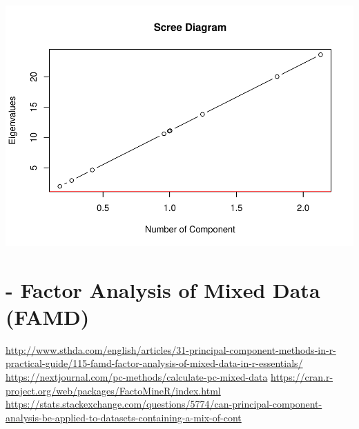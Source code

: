 \documentclass[
]{article}
\newenvironment{Shaded}{\begin{snugshade}}{\end{snugshade}}
\newcommand{\CommentTok}[1]{\textcolor[rgb]{0.56,0.35,0.01}{\textit{#1}}}
\newcommand{\DataTypeTok}[1]{\textcolor[rgb]{0.13,0.29,0.53}{#1}}
\newcommand{\DecValTok}[1]{\textcolor[rgb]{0.00,0.00,0.81}{#1}}
\newcommand{\KeywordTok}[1]{\textcolor[rgb]{0.13,0.29,0.53}{\textbf{#1}}}
\newcommand{\NormalTok}[1]{#1}
\newcommand{\OperatorTok}[1]{\textcolor[rgb]{0.81,0.36,0.00}{\textbf{#1}}}
\newcommand{\StringTok}[1]{\textcolor[rgb]{0.31,0.60,0.02}{#1}}
\begin{document}
\begin{Shaded}
\end{Shaded}

\includegraphics{project-code_files/figure-latex/unnamed-chunk-31-1.pdf}

\hypertarget{factor-analysis-of-mixed-data-famd}{%
\section{- Factor Analysis of Mixed Data
(FAMD)}\label{factor-analysis-of-mixed-data-famd}}

\url{http://www.sthda.com/english/articles/31-principal-component-methods-in-r-practical-guide/115-famd-factor-analysis-of-mixed-data-in-r-essentials/}
\url{https://nextjournal.com/pc-methods/calculate-pc-mixed-data}
\url{https://cran.r-project.org/web/packages/FactoMineR/index.html}
\url{https://stats.stackexchange.com/questions/5774/can-principal-component-analysis-be-applied-to-datasets-containing-a-mix-of-cont}
\end{document}
